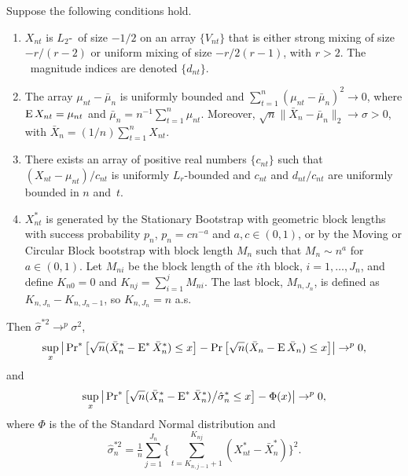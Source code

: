 \documentclass[11pt]{article}
\begin{document}
\begin{thm}\label{main-bootstrap-clt}
  Suppose the following conditions hold.
  \begin{enumerate}
  \item $X_{nt}$ is $L_2$-\ned\ of size $-1/2$ on an array
    $\{V_{nt}\}$ that is either strong mixing of size $-r/(r-2)$ or
    uniform mixing of size $-r/2(r-1)$, with $r > 2$.  The
    \ned\ magnitude indices are denoted $\{d_{nt}\}$.
  \item The array $\mu_{nt} - \bar \mu_n$ is uniformly bounded
    and $\sum_{t=1}^n (\mu_{nt} - \bar \mu_n)^2 \to 0$,
    where $\operatorname{E} X_{nt} = \mu_{nt}$ and $\bar{\mu}_n = n^{-1} \sum_{t=1}^n
    \mu_{nt}$. Moreover, $\sqrt{n} \| \bar{X}_{n} - \bar\mu_n \|_2
    \to \sigma > 0$, with $\bar X_n = (1/n) \sum_{t=1}^n X_{nt}$.
  \item There exists an array of positive real numbers $\{c_{nt}\}$
    such that $(X_{nt} - \mu_{nt})/c_{nt}$ is uniformly $L_r$-bounded
    and $c_{nt}$ and $d_{nt}/c_{nt}$ are uniformly bounded in $n$
    and~$t$.
  \item $X_{nt}^{*}$ is generated by the Stationary Bootstrap with
    geometric block lengths with success probability $p_n$, $p_n = c
    n^{-a}$ and $a,c \in (0,1)$, or by the Moving or Circular Block
    bootstrap with block length $M_n$ such that $M_n \sim n^a$ for
    $a \in (0,1)$.  Let $M_{ni}$ be the block length of the $i$th
    block, $i=1,\dots,J_n$, and define $K_{n0} = 0$ and $K_{nj} =
    \sum_{i=1}^j M_{ni}$. The last block, $M_{n,J_n}$, is defined as
    $K_{n,J_n} - K_{n,J_n-1}$, so $K_{n,J_n} = n$ a.s.
  \end{enumerate}
  Then $\hat\sigma^{*2} \to^p \sigma^2$,
  \begin{equation}\label{eq:36}
    \sup_x \big\lvert \operatorname{Pr}^{*}\big[\sqrt{n}(\bar X_{n}^{*} - \operatorname{E}^* \bar X_n^*) \leq x \big]
    - \operatorname{Pr} \big[\sqrt{n}(\bar X_{n} - \operatorname{E} \bar X_n) \leq x \big] \big\rvert \to^p 0,
  \end{equation}
  and
  \begin{equation}
    \label{eq:2}
    \sup_x \big\lvert \operatorname{Pr}^{*}\big[
    \sqrt{n}(\bar X_{n}^{*} -  \operatorname{E}^* \bar X_n^*) \big/ \hat\sigma_n^{*}
    \leq x \big] - \Phi(x) \big\rvert \to^p 0,
  \end{equation}
  where $\Phi$ is the  of the Standard Normal
  distribution and
    \begin{equation}
      \label{eq:3}
      \hat{\sigma}_n^{*2} = \tfrac{1}{n} \sum_{j=1}^{J_n}
      \Big\{\sum_{t=K_{n,j-1}+1}^{K_{nj}} (X_{nt}^{*} - \bar X_{n}^{*})\Big\}^2.
    \end{equation}
\end{thm}
\end{document}
